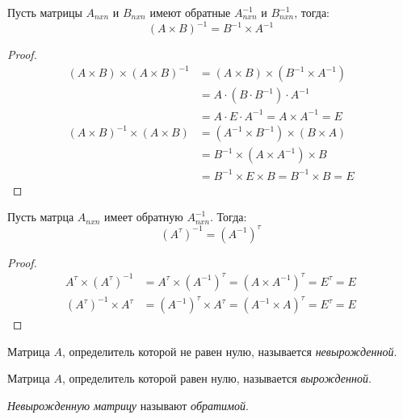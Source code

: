 \begin{theorem}
  Пусть матрицы $A_{n x n}$ и  $B_{n x n}$ имеют обратные $A^{-1}_{n x n}$ и  $B^{-1}_{n x n}$, тогда: \[
    (A \times B)^{-1} = B^{-1} \times A^{-1}
  \]
\end{theorem}
\begin{proof}
  \begin{align*}
    (A \times B) \times (A \times B)^{-1} &= (A \times B) \times (B^{-1} \times A^{-1}) \\ 
                          &= A \cdot (B \cdot B^{-1}) \cdot A^{-1} \\
                          &= A \cdot E \cdot A^{-1} = A \times A^{-1} = E \\
    (A \times B)^{-1} \times (A \times B) &= (A^{-1} \times B^{-1}) \times (B \times A) \\ 
                          &= B^{-1} \times (A \times A^{-1}) \times B \\
                          &= B^{-1} \times E \times B = B^{-1} \times B = E
  \end{align*}
\end{proof}

\begin{theorem}
  Пусть матрца $A_{nxn}$ имеет обратную $A^{-1}_{nxn}$. Тогда: \[
    \left( A^\tau \right) ^{-1} = \left( A^{-1} \right) ^\tau
  \] 
\end{theorem}
\begin{proof}
  \begin{align*}
    A^\tau \times (A^\tau)^{-1} &= A^\tau \times \left( A^{-1} \right)^\tau = (A \times A^{-1})^\tau = E^\tau = E \\
    (A^\tau)^{-1} \times A^\tau &= \left( A^{-1} \right)^\tau \times A^\tau = (A^{-1} \times A)^\tau = E^\tau = E
  \end{align*}
\end{proof}

\begin{definition}
  Матрица $A$, определитель которой не равен нулю, называется \textit{невырожденной}.
\end{definition}

\begin{definition}
  Матрица $A$, определитель которой равен нулю, называется \textit{вырожденной}.
\end{definition}

\begin{note}
  \textit{Невырожденную матрицу} называют \textit{обратимой}. 
\end{note}

